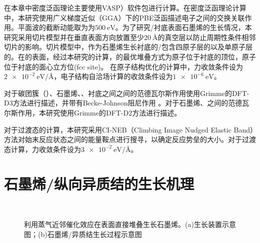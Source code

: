 在本章中密度泛函理论主要使用VASP）软件包进行计算。在密度泛函理论计算中，本研究使用广义梯度近似（GGA）下的PBE泛函描述电子之间的交换关联作用。平面波的截断动能取为为$\SI{500}{\electronvolt}$。为了研究/衬底表面石墨烯的生长情况，本研究采用切片模型并在垂直表面方向放置至少$\SI{20}{\angstrom}$的真空层以防止周期性条件相邻切片的影响。切片模型中，作为石墨烯生长衬底的/包含四原子层的以及单原子层的。在的表面，经过本研究的计算，的最优堆叠方式为原子位于衬底的顶位，原子位于衬底的面心立方位(fcc site)。
在原子结构优化的计算中，力收敛条件设为$\SI{2e-2}{\electronvolt \per \angstrom}$，电子结构自洽场计算的收敛条件设为$\SI{1e-6}{\electronvolt}$。

对于碳团簇（）、石墨烯、、衬底之间之间的范德瓦尔斯作用使用Grimme的DFT-D3方法进行描述，并带有Becke-Johnson阻尼作用 。对于石墨烯、之间的范德瓦尔斯作用，本研究使用Grimme的DFT-D2方法进行描述。

对于过渡态的计算，本研究采用CI-NEB（Climbing Image Nudged Elastic Band）方法对始末反应状态之间的能量鞍点进行搜寻，以确定反应势垒的大小。对于过渡态计算，力收敛条件设为$\SI{3e-2}{\electronvolt \per \angstrom}$。

\section{石墨烯/纵向异质结的生长机理}
    \label{cap:CG}
    \begin{figure}[htb]
        \\[-0.5ex]
        \caption{利用蒸气近邻催化效应在表面直接堆叠生长石墨烯。(a)生长装置示意图；(b)石墨烯/异质结生长过程示意图}
        \label{fig:CG_diagram_CVD}
    \end{figure}


